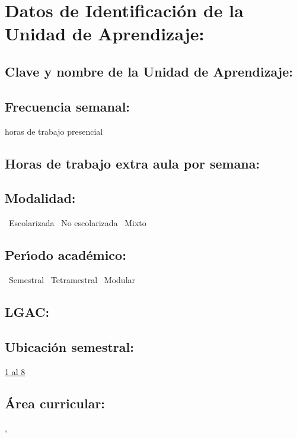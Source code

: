 \documentclass[10 pt]{article}
\begin{document}

\section{Datos de Identificaci\'{o}n de la Unidad de Aprendizaje:}
\subsection{Clave y nombre de la Unidad de Aprendizaje:} 
\subsection{Frecuencia semanal:} horas de trabajo presencial
\subsection{Horas de trabajo extra aula por semana:}  %
\subsection{Modalidad:} \yes~Escolarizada \no~No escolarizada \no~Mixto
\subsection{Per\'{\i}odo acad\'{e}mico:} \yes~Semestral
\no~Tetramestral \no~Modular

%
%

\subsection{LGAC:} \underline{\seys}

\subsection{Ubicaci\'{o}n semestral:} \underline{1 al 8} %
\subsection{\'{A}rea curricular:} \underline{\fb, \le} %
\end{document}
